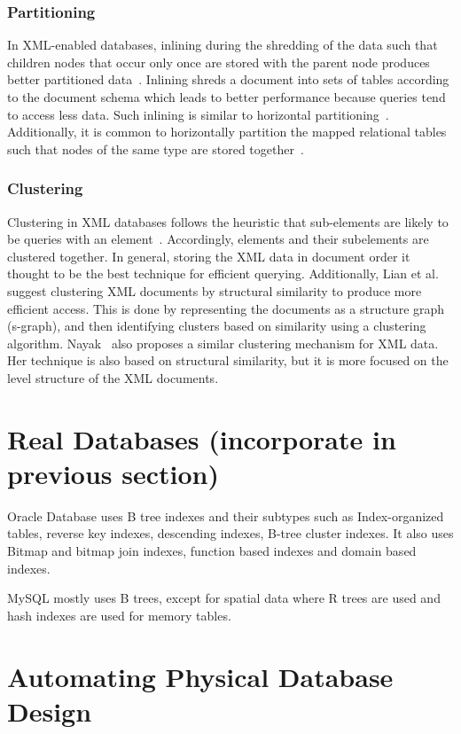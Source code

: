 \documentclass[12pt,a4paper]{article}
\begin{document}
\subsubsection{Partitioning}
In XML-enabled databases, inlining during the shredding of the data such that children nodes that occur only once are stored with the parent node produces
better partitioned data~\cite{tatarinov2002storing}. Inlining shreds a document into sets of tables according to the document schema which leads to better
performance because queries tend to access less data. Such inlining is similar to horizontal partitioning~\cite{ramanath2003searching}. Additionally, it is
common to horizontally partition the mapped relational tables such that nodes of the same type are stored together~\cite{amer2002overview}.

\subsubsection{Clustering}
Clustering in XML databases follows the heuristic that sub-elements are likely to be queries with an element~\cite{jagadish2002timber}. Accordingly, elements
and their subelements are clustered together. In general, storing the XML data in document order it thought to be the best technique for efficient querying.
Additionally, Lian et al.~\cite{lian2004efficient} suggest clustering XML documents by structural similarity to produce more efficient access. This is done by
representing the documents as a structure graph (s-graph), and then identifying clusters based on similarity using a clustering algorithm.
Nayak~\cite{nayak2008fast} also proposes a similar clustering mechanism for XML data. Her technique is also based on structural similarity, but it is more
focused on the level structure of the XML documents.

\section{Real Databases (incorporate in previous section)}

Oracle Database uses B tree indexes and their subtypes such as Index-organized tables, reverse key indexes, descending indexes, B-tree cluster indexes. It also
uses Bitmap and bitmap join indexes, function based indexes and domain based indexes.


MySQL mostly uses B trees, except for spatial data where R trees are used and hash indexes are used for memory tables.

\section{Automating Physical Database Design}
\label{SEC-AUTO}
\end{document}
